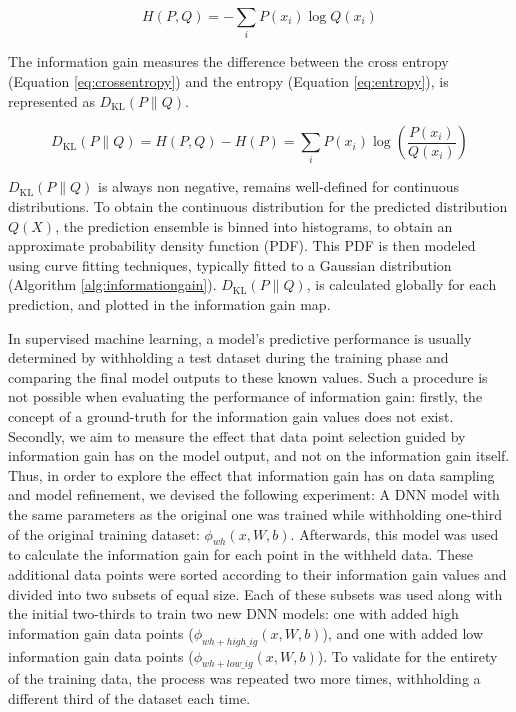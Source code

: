 \documentclass[journal abbreviation, manuscript]{copernicus}
\begin{document}
\begin{equation}
\label{eq:crossentropy}
    H (P, Q) = -\sum_i P (x_i) \log Q (x_i)
\end{equation}


The information gain measures the difference between the cross entropy (Equation \ref{eq:crossentropy}) and the entropy (Equation \ref{eq:entropy}), is represented as $D_{\text{KL}} (P \| Q)$. 

\begin{equation}
    D_{\text{KL}} (P \| Q) = H (P, Q) - H (P) = \sum_i P (x_i) \log\left (\frac{P (x_i)}{Q (x_i)}\right)
\end{equation}


$D_{\text{KL}} (P \| Q)$ is always non negative, remains well-defined for continuous distributions. To obtain the continuous distribution for the predicted distribution $Q (X)$, the prediction ensemble is binned into histograms, to obtain an approximate probability density function (PDF). This PDF is then modeled using curve fitting techniques, typically fitted to a Gaussian distribution (Algorithm \ref{alg:informationgain}). $D_{\text{KL}} (P \| Q)$, is calculated globally for each prediction, and plotted in the information gain map. 

In supervised machine learning, a model's predictive performance is usually determined by withholding a test dataset during the training phase and comparing the final model outputs to these known values. Such a procedure is not possible when evaluating the performance of information gain: firstly, the concept of a ground-truth for the information gain values does not exist. Secondly, we aim to measure the effect that data point selection guided by information gain has on the model output, and not on the information gain itself. Thus, in order to explore the effect that information gain has on data sampling and model refinement, we devised the following experiment:
A DNN model with the same parameters as the original one was trained while withholding one-third of the original training dataset: $\phi_{wh} (x, W, b)$. Afterwards, this model was used to calculate the information gain for each point in the withheld data. These additional data points were sorted according to their information gain values and divided into two subsets of equal size. Each of these subsets was used along with the initial two-thirds to train two new DNN models: one with added high information gain data points ($\phi_{wh+high\_ig} (x, W, b)$), and one with added low information gain data points ($\phi_{wh+low\_ig} (x, W, b)$). To validate for the entirety of the training data, the process was repeated two more times, withholding a different third of the dataset each time. 
\end{document}
